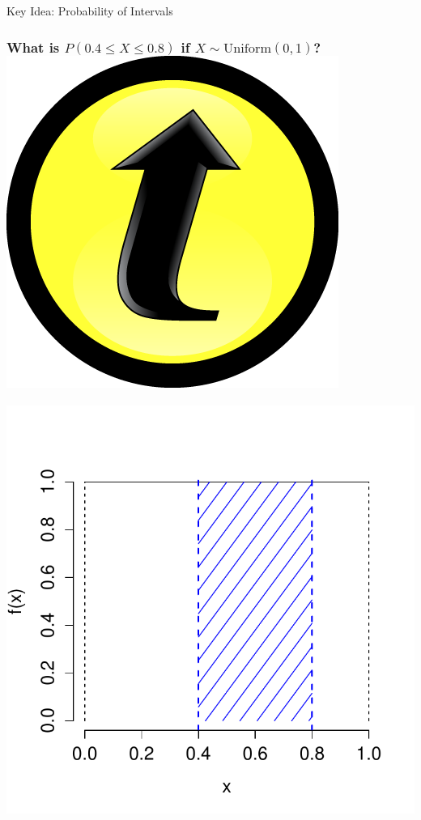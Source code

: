 \documentclass[handout]{beamer}
\begin{document}
\begin{frame}
\Huge \begin{center}Key Idea: Probability of Intervals\end{center}
\end{frame}
\begin{frame}
\frametitle{What is $P(0.4 \leq X \leq 0.8)$ if $X\sim \mbox{Uniform}(0,1)$? \hfill \includegraphics[scale = 0.05]{./images/clicker}}
\centering
	\includegraphics[scale = 0.6]{./images/uniform_density_interval}


\end{frame}
\end{document}
